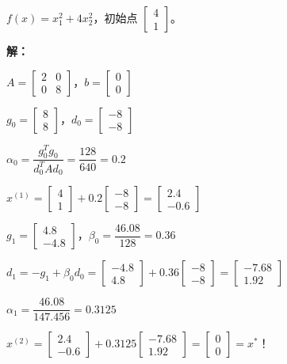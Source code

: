 \begin{example}[CG法解二次函数]
$f(x) = x_1^2 + 4x_2^2$，初始点 $\begin{bmatrix} 4 \\ 1 \end{bmatrix}$。

\textbf{解：}

$A = \begin{bmatrix} 2 & 0 \\ 0 & 8 \end{bmatrix}$，$b = \begin{bmatrix} 0 \\ 0 \end{bmatrix}$

$g_0 = \begin{bmatrix} 8 \\ 8 \end{bmatrix}$，$d_0 = \begin{bmatrix} -8 \\ -8 \end{bmatrix}$

$\alpha_0 = \dfrac{g_0^T g_0}{d_0^T A d_0} = \dfrac{128}{640} = 0.2$

$x^{(1)} = \begin{bmatrix} 4 \\ 1 \end{bmatrix} + 0.2\begin{bmatrix} -8 \\ -8 \end{bmatrix} = \begin{bmatrix} 2.4 \\ -0.6 \end{bmatrix}$

$g_1 = \begin{bmatrix} 4.8 \\ -4.8 \end{bmatrix}$，$\beta_0 = \dfrac{46.08}{128} = 0.36$

$d_1 = -g_1 + \beta_0 d_0 = \begin{bmatrix} -4.8 \\ 4.8 \end{bmatrix} + 0.36\begin{bmatrix} -8 \\ -8 \end{bmatrix} = \begin{bmatrix} -7.68 \\ 1.92 \end{bmatrix}$

$\alpha_1 = \dfrac{46.08}{147.456} = 0.3125$

$x^{(2)} = \begin{bmatrix} 2.4 \\ -0.6 \end{bmatrix} + 0.3125\begin{bmatrix} -7.68 \\ 1.92 \end{bmatrix} = \begin{bmatrix} 0 \\ 0 \end{bmatrix} = x^*$！
\end{example}

